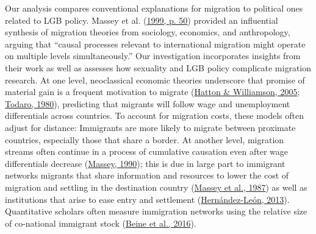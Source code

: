 \documentclass[
  11pt,
]{article}
\begin{document}
Our analysis compares conventional explanations for migration to political ones related to LGB policy. Massey et al. (\protect\hyperlink{ref-massey_1999}{1999, p. 50}) provided an influential synthesis of migration theories from sociology, economics, and anthropology, arguing that ``causal processes relevant to international migration might operate on multiple levels simultaneously.'' Our investigation incorporates insights from their work as well as assesses how sexuality and LGB policy complicate migration research. At one level, neoclassical economic theories underscore that promise of material gain is a frequent motivation to migrate (\protect\hyperlink{ref-hatton_2005a}{Hatton \& Williamson, 2005}; \protect\hyperlink{ref-todaro_1980}{Todaro, 1980}), predicting that migrants will follow wage and unemployment differentials across countries. To account for migration costs, these models often adjust for distance: Immigrants are more likely to migrate between proximate countries, especially those that share a border. At another level, migration streams often continue in a process of cumulative causation even after wage differentials decrease (\protect\hyperlink{ref-massey_1990_social}{Massey, 1990}); this is due in large part to immigrant networks migrants that share information and resources to lower the cost of migration and settling in the destination country (\protect\hyperlink{ref-massey_1987}{Massey et al., 1987}) as well as institutions that arise to ease entry and settlement (\protect\hyperlink{ref-hernandez-leon_2013}{Hernández-León, 2013}). Quantitative scholars often measure immigration networks using the relative size of co-national immigrant stock (\protect\hyperlink{ref-beine_2016}{Beine et al., 2016}).
\end{document}

